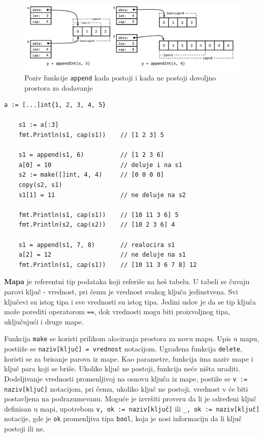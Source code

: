 \documentclass[12pt,oneside]{memoir}
\begin{document}
\begin{figure}
\begin{center}
\includegraphics[scale=0.37]{slice.png}
\end{center}
\caption{Poziv funkcije \texttt{append} kada postoji i kada ne postoji dovoljno prostora za dodavanje}
\label{fig:slice}
\end{figure}

\begin{center}
\begin{lstlisting}[caption=Primer koji demonstrira rad sa isečcima, label={lst:slice},  backgroundcolor=\color{background}]
	a := [...]int{1, 2, 3, 4, 5}
	
	s1 := a[:3] 				
	fmt.Println(s1, cap(s1))	// [1 2 3] 5
	
	s1 = append(s1, 6) 			// [1 2 3 6]
	a[0] = 10					// deluje i na s1
	s2 := make([]int, 4, 4)		// [0 0 0 0] 
	copy(s2, s1)
	s1[1] = 11					// ne deluje na s2
	
	fmt.Println(s1, cap(s1)) 	// [10 11 3 6] 5
	fmt.Println(s2, cap(s2)) 	// [10 2 3 6] 4
	
	s1 = append(s1, 7, 8)		// realocira s1
	a[2] = 12					// ne deluje na s1
	fmt.Println(s1, cap(s1))	// [10 11 3 6 7 8] 12
\end{lstlisting}
\end{center}

\textbf{Mapa} je referentni tip podataka koji referiše na heš tabelu. U tabeli se čuvaju parovi ključ - vrednost, pri čemu je vrednost svakog ključa jedinstvena. Svi ključevi su istog tipa i sve vrednosti su istog tipa. Jedini uslov je da se tip ključa može porediti operatorom \texttt{==}, dok vrednosti mogu biti proizvoljnog tipa, uključujući i druge mape. 

Funkcija \texttt{make} se koristi prilikom alociranja prostora za novu mapu. Upis u mapu, postiiže se \texttt{naziv[ključ] = vrednost} notacijom. Ugrađena funkcija \texttt{delete}, koristi se za brisanje parova iz mape. Kao parametre, funkcija ima naziv mape i ključ para koji se briše. Ukoliko ključ ne postoji, funkcija neće ništa uraditi. Dodeljivanje vrednosti promenljivoj na osnovu ključa iz mape, postiže se \texttt{v := naziv[ključ]} notacijom, pri čemu, ukoliko ključ ne postoji, vrednost v će biti postavljena na podrazumevanu. Moguće je izvršiti proveru da li je određeni ključ definisan u mapi, upotrebom \texttt{v, ok := naziv[ključ]} ili  \texttt{\_, ok := naziv[ključ]} notacije, gde je \texttt{ok} promenljiva tipa \texttt{bool}, koja je nosi informaciju da li ključ postoji ili ne. 
\end{document}
